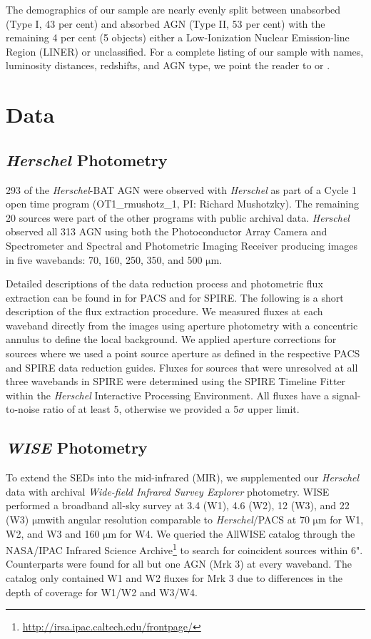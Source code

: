\documentclass[fleqn,usenatbib]{mnras}
\newcommand{\herschel}{\emph{Herschel}}
\newcommand{\um}{$\mathrm{\mu}$m}
\begin{document}
The demographics of our sample are nearly evenly split between unabsorbed (Type I, 43 per cent) and absorbed AGN (Type II, 53 per cent) with the remaining 4 per cent (5 objects) either a Low-Ionization Nuclear Emission-line Region (LINER) or unclassified. For a complete listing of our sample with names, luminosity distances, redshifts, and AGN type, we point the reader to \citet{Melendez:2014yu} or \citet{Shimizu:2016qy}.

\section{Data}
\subsection{\herschel{} Photometry}
293 of the \herschel{}-BAT AGN were observed with \herschel{} \citep{Pilbratt:2010rz} as part of a Cycle 1 open time program (OT1\_rmushotz\_1, PI: Richard Mushotzky). The remaining 20 sources were part of the other programs with public archival data. \herschel{} observed all 313 AGN using both the Photoconductor Array Camera and Spectrometer \citep[PACS;][]{Poglitsch:2010fp} and Spectral and Photometric Imaging Receiver \citep[SPIRE;][]{Griffin:2010sf} producing images in five wavebands: 70, 160, 250, 350, and 500 \um.

Detailed descriptions of the data reduction process and photometric flux extraction can be found in \citet{Melendez:2014yu} for PACS and \citet{Shimizu:2016qy} for SPIRE. The following is a short description of the flux extraction procedure. We measured fluxes at each waveband directly from the images using aperture photometry with a concentric annulus to define the local background. We applied aperture corrections for sources where we used a point source aperture as defined in the respective PACS and SPIRE data reduction guides. Fluxes for sources that were unresolved at all three wavebands in SPIRE were determined using the SPIRE Timeline Fitter within the \herschel{} Interactive Processing Environment. All fluxes have a signal-to-noise ratio of at least 5, otherwise we provided a 5$\sigma$ upper limit. 

\subsection{\textit{WISE} Photometry}
To extend the SEDs into the mid-infrared (MIR), we supplemented our \herschel{} data with archival \textit{Wide-field Infrared Survey Explorer} \citep[WISE;][]{Wright:2010fk} photometry. WISE performed a broadband all-sky survey at 3.4 (W1), 4.6 (W2), 12 (W3), and 22 (W3) \um with angular resolution comparable to \herschel/PACS at 70 \um{} for W1, W2, and W3 and 160 \um{} for W4. We queried the AllWISE catalog through the NASA/IPAC Infrared Science Archive\footnote{\url{http://irsa.ipac.caltech.edu/frontpage/}} to search for coincident sources within 6". Counterparts were found for all but one AGN (Mrk 3) at every waveband. The catalog only contained W1 and W2 fluxes for Mrk 3 due to differences in the depth of coverage for W1/W2 and W3/W4.
\end{document}
